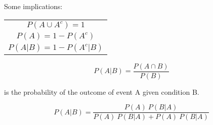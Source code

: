 Some implications:

\begin{center}
  \begin{tabular}{c}
    $P(A \cup A^c) = 1$ \\
    $P(A) = 1 - P(A^c)$ \\
    $P(A|B) = 1 - P(A^c | B)$ \\
  \end{tabular}
\end{center}
\hformbar





\begin{equation}
	P(A|B) = \frac{P(A \cap B)}{P(B)}
\end{equation} 

is the probability of the outcome of event A given condition B.
\hformbar




\begin{equation}
  P(A|B) = \frac{P(A) ~P(B|A)}{ P(A) ~ P(B|A) + P(A) ~ P(B|A)}
\end{equation}

\hformbar



